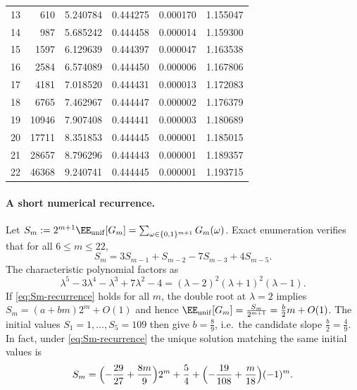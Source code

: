 \begin{table}[t]
\begin{tabular}{rrrrrr}
13 & 610 & 5.240784 & 0.444275 & 0.000170 & 1.155047 \\
14 & 987 & 5.685242 & 0.444458 & 0.000014 & 1.159300 \\
15 & 1597 & 6.129639 & 0.444397 & 0.000047 & 1.163538 \\
16 & 2584 & 6.574089 & 0.444450 & 0.000006 & 1.167806 \\
17 & 4181 & 7.018520 & 0.444431 & 0.000013 & 1.172083 \\
18 & 6765 & 7.462967 & 0.444447 & 0.000002 & 1.176379 \\
19 & 10946 & 7.907408 & 0.444441 & 0.000003 & 1.180689 \\
20 & 17711 & 8.351853 & 0.444445 & 0.000001 & 1.185015 \\
21 & 28657 & 8.796296 & 0.444443 & 0.000001 & 1.189357 \\
22 & 46368 & 9.240741 & 0.444445 & 0.000001 & 1.193715 \\
\bottomrule
\end{tabular}
\end{table}

\paragraph{A short numerical recurrence.}
Let $S_m:=2^{m+1}\EE_{\mathrm{unif}}[G_m]=\sum_{\omega\in\{0,1\}^{m+1}}G_m(\omega)$. Exact enumeration verifies that for all $6\le m\le 22$,
\begin{equation}\label{eq:Sm-recurrence}
S_m = 3S_{m-1}+S_{m-2}-7S_{m-3}+4S_{m-5}.
\end{equation}
The characteristic polynomial factors as
\[
\lambda^5-3\lambda^4-\lambda^3+7\lambda^2-4
=
(\lambda-2)^2(\lambda+1)^2(\lambda-1).
\]
If \eqref{eq:Sm-recurrence} holds for all $m$, the double root at $\lambda=2$ implies $S_m=(a+bm)2^m+O(1)$ and hence $\EE_{\mathrm{unif}}[G_m]=\frac{S_m}{2^{m+1}}=\frac{b}{2}m+O(1)$. The initial values $S_1=1,\dots,S_5=109$ then give $b=\frac{8}{9}$, i.e.\ the candidate slope $\frac{b}{2}=\frac{4}{9}$.
In fact, under \eqref{eq:Sm-recurrence} the unique solution matching the same initial values is
\[
S_m = \Bigl(-\frac{29}{27}+\frac{8m}{9}\Bigr)2^m + \frac54 + \Bigl(-\frac{19}{108}+\frac{m}{18}\Bigr)(-1)^m.
\]
